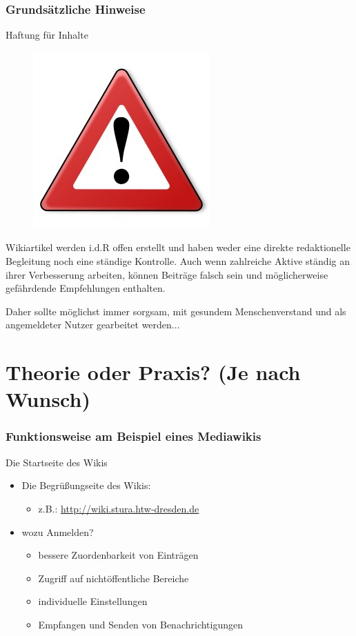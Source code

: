 \documentclass{beamer}              %
\begin{document}
\begin{frame}
  \frametitle{Grundsätzliche Hinweise}{Haftung für Inhalte}

  \begin{figure}
      \includegraphics[scale=0.25]{Warning_256px}
      \label{fig:Warnschild}
  \end{figure}  
 
  \begin{block}{}
    Wikiartikel werden i.d.R offen erstellt und haben weder eine direkte redaktionelle
    Begleitung noch eine ständige Kontrolle. Auch wenn zahlreiche Aktive
    ständig an ihrer Verbesserung arbeiten, können Beiträge falsch sein und
    möglicherweise gefährdende Empfehlungen enthalten.
  \end{block}
  \begin{block}{}
    Daher sollte möglichst immer sorgsam, mit gesundem
    Menschenverstand und als angemeldeter Nutzer gearbeitet werden...
  \end{block}
\end{frame}

\section{Theorie oder Praxis? (Je nach Wunsch)}

\begin{frame}
  \frametitle{Funktionsweise am Beispiel eines Mediawikis}{Die Startseite des Wikis}

  \begin{itemize}[<+->]
    \item Die Begrüßungseite des Wikis:
    \begin{itemize}
      \item z.B.: \url{http://wiki.stura.htw-dresden.de}
    \end{itemize}
    \item wozu Anmelden?
    \begin{itemize}
      \item bessere Zuordenbarkeit von Einträgen
      \item Zugriff auf nichtöffentliche Bereiche
      \item individuelle Einstellungen
      \item Empfangen und Senden von Benachrichtigungen
    \end{itemize}
  \end{itemize}
\end{frame}
\end{document}
